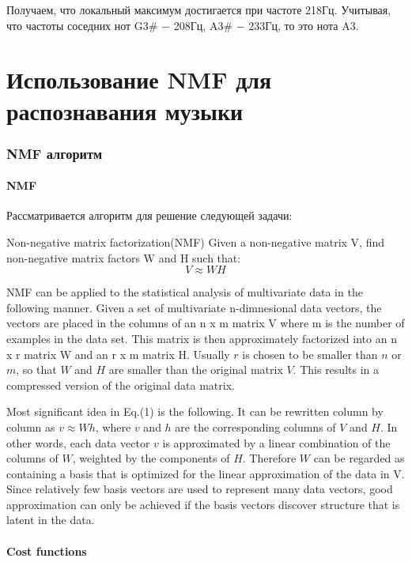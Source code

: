 \documentclass[oneside, final, 14pt]{extarticle}
\begin{document}
  Получаем, что локальный максимум достигается при частоте 218Гц. Учитывая,
  что частоты соседних нот G3\# $-$ 208Гц, A3\# $-$ 233Гц, то это нота A3.

\cleardoublepage
\part{Использование NMF для распознавания музыки}
\section{NMF алгоритм}
\subsection{NMF}

Рассматривается алгоритм для решение следующей задачи:

Non-negative matrix factorization(NMF) Given a non-negative matrix
V, find non-negative matrix factors W and H such that:
\begin{equation}
    V \approx W H
\end{equation}

NMF can be applied to the statistical analysis of multivariate data
in the following manner.
Given a set of multivariate n-dimnesional data vectors, the vectors
are placed in the columns of an n x m matrix V
where m is the number of examples in the data set.
This matrix is then approximately factorized into an n x r matrix
W and an r x m matrix H.
Usually $r$ is chosen to be smaller than $n$ or $m$,
so that $W$ and $H$ are smaller than the original matrix $V$.
This results in a compressed version of the original data matrix.

Most significant idea in Eq.(1) is the following. It can be rewritten
column by column as $v \approx W h$, where $v$ and $h$ are the
corresponding columns of $V$ and $H$.
In other words, each data vector $v$ is approximated by a linear
combination of the columns of $W$, weighted by the components of $H$.
Therefore $W$ can be regarded as containing a basis
that is optimized for the linear approximation of the data in V.
Since relatively few basis vectors are used to represent
many data vectors, good approximation
can only be achieved if the basis vectors discover structure that is
latent in the data.

\subsection{Cost functions}
\end{document}
